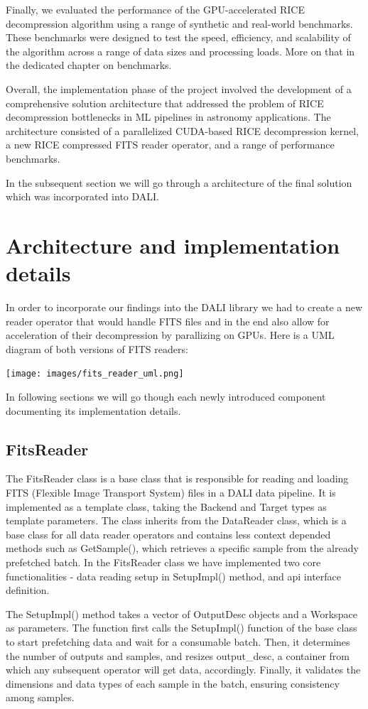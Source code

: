 \documentclass[licencjacka,en]{pracamgr}
\begin{document}
Finally, we evaluated the performance of the GPU-accelerated RICE decompression algorithm using a range of synthetic and real-world benchmarks. These benchmarks were designed to test the speed, efficiency, and scalability of the algorithm across a range of data sizes and processing loads. More on that in the dedicated chapter on benchmarks. 

Overall, the implementation phase of the project involved the development of a comprehensive solution architecture that addressed the problem of RICE decompression bottlenecks in ML pipelines in astronomy applications. The architecture consisted of a parallelized CUDA-based RICE decompression kernel, a new RICE compressed FITS reader operator, and a range of performance benchmarks.

In the subsequent section we will go through a architecture of the final solution which was incorporated into DALI.

\section{Architecture and implementation details}
In order to incorporate our findings into the DALI library we had to create a new reader operator that would handle FITS files and in the end also allow for acceleration of their decompression by parallizing on GPUs. Here is a UML diagram of both versions of FITS readers:\\

\centerline{\texttt{[image: images/fits\_reader\_uml.png]}}

In following sections we will go though each newly introduced component documenting its implementation details.
\subsection{FitsReader}
The FitsReader class is a base class that is responsible for reading and loading FITS (Flexible Image Transport System) files in a DALI data pipeline. It is implemented as a template class, taking the Backend and Target types as template parameters. The class inherits from the DataReader class, which is a base class for all data reader operators and contains less context depended methods such as GetSample(), which retrieves a specific sample from the already prefetched batch. In the FitsReader class we have implemented two core functionalities - data reading setup in SetupImpl() method, and api interface definition. 

The SetupImpl() method takes a vector of OutputDesc objects and a Workspace as parameters. The function first calls the SetupImpl() function of the base class to start prefetching data and wait for a consumable batch. Then, it determines the number of outputs and samples, and resizes output\_desc, a container from which any subsequent operator will get data, accordingly. 
Finally, it validates the dimensions and data types of each sample in the batch, ensuring consistency among samples. 
\end{document}
